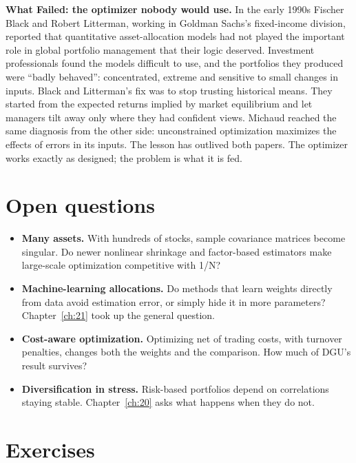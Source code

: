 \begin{callout}
\textbf{What Failed: the optimizer nobody would use.} In the early 1990s Fischer Black and Robert Litterman, working in Goldman Sachs's fixed-income division, reported that quantitative asset-allocation models had not played the important role in global portfolio management that their logic deserved. Investment professionals found the models difficult to use, and the portfolios they produced were ``badly behaved'': concentrated, extreme and sensitive to small changes in inputs. Black and Litterman's fix was to stop trusting historical means. They started from the expected returns implied by market equilibrium and let managers tilt away only where they had confident views. Michaud reached the same diagnosis from the other side: unconstrained optimization maximizes the effects of errors in its inputs. The lesson has outlived both papers. The optimizer works exactly as designed; the problem is what it is fed.
\end{callout}

\section{Open questions}
\label{sec:19-open}

\begin{itemize}
  \item \textbf{Many assets.} With hundreds of stocks, sample covariance matrices become singular. Do newer nonlinear shrinkage and factor-based estimators make large-scale optimization competitive with 1/N?
  \item \textbf{Machine-learning allocations.} Do methods that learn weights directly from data avoid estimation error, or simply hide it in more parameters? Chapter~\ref{ch:21} took up the general question.
  \item \textbf{Cost-aware optimization.} Optimizing net of trading costs, with turnover penalties, changes both the weights and the comparison. How much of DGU's result survives?
  \item \textbf{Diversification in stress.} Risk-based portfolios depend on correlations staying stable. Chapter~\ref{ch:20} asks what happens when they do not.
\end{itemize}

\section*{Exercises}

